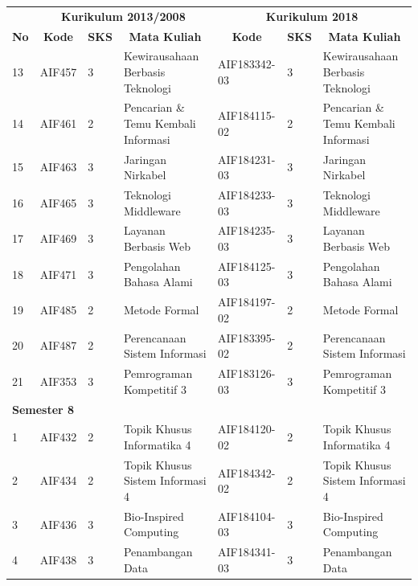 \begin{table}[H]
\centering
\label{tab:aturankonversipilihan_3}
\begin{tabular}{|p{0.35cm}|p{2cm}|p{0.55cm}|p{3.45cm}|p{2.65cm}|p{0.55cm}|p{3.45cm}|}
\hline
\multicolumn{1}{|c|}{} & \multicolumn{3}{c|}{\textbf{Kurikulum 2013/2008}} & \multicolumn{3}{c|}{\textbf{Kurikulum 2018}} \\ \cline{2-7} 
\multicolumn{1}{|c|}{\multirow{-2}{*}{\textbf{No}}} & \multicolumn{1}{c|}{\textbf{Kode}} & \multicolumn{1}{c|}{\textbf{SKS}} & \multicolumn{1}{c|}{\textbf{Mata Kuliah}} & \multicolumn{1}{c|}{\textbf{Kode}} & \multicolumn{1}{c|}{\textbf{SKS}} & \multicolumn{1}{c|}{\textbf{Mata Kuliah}} \\ \hline
13 & AIF457 & 3 & Kewirausahaan Berbasis Teknologi & AIF183342-03 & 3  & Kewirausahaan Berbasis Teknologi \\ \hline
14 & AIF461 &  2 & Pencarian \& Temu Kembali Informasi & AIF184115-02& 2& Pencarian \& Temu Kembali Informasi  \\ \hline
15 & AIF463 &  3 & Jaringan Nirkabel  & AIF184231-03 & 3 & Jaringan Nirkabel    \\ \hline
16 & AIF465 &  3 & Teknologi Middleware  & AIF184233-03  & 3  & Teknologi Middleware   \\ \hline
17 & AIF469 & 3 & Layanan Berbasis Web  & AIF184235-03  & 3  & Layanan Berbasis Web   \\ \hline
18 & AIF471 & 3 & Pengolahan Bahasa Alami  & AIF184125-03 & 3 & Pengolahan Bahasa Alami \\ \hline
19 & AIF485 & 2 &  Metode Formal & AIF184197-02  & 2  & Metode Formal  \\ \hline
20 & AIF487 & 2 & Perencanaan Sistem Informasi  & AIF183395-02  & 2  & Perencanaan Sistem Informasi  \\ \hline
21 & AIF353    & 3 & Pemrograman Kompetitif 3 & AIF183126-03 & 3  & Pemrograman Kompetitif 3 \\ \hline
\multicolumn{7}{|l|}{\textbf{Semester 8}} \\ \hline
1 & AIF432 & 2 & Topik Khusus Informatika 4 & AIF184120-02 & 2 & Topik Khusus Informatika 4 \\ \hline
2 & AIF434 & 2 & Topik Khusus Sistem Informasi 4 & AIF184342-02 & 2 & Topik Khusus Sistem Informasi 4 \\ \hline
3 & AIF436 & 3 & Bio-Inspired Computing & AIF184104-03 & 3 & Bio-Inspired Computing \\ \hline
4 & AIF438 & 3 & Penambangan Data & AIF184341-03 & 3 & Penambangan Data \\ \hline

\end{tabular}
\end{table}
